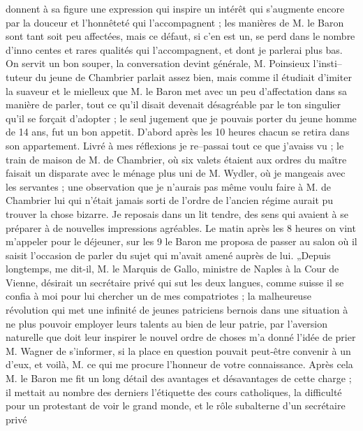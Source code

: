 \documentclass[12pt]{article}
\begin{document}
 donnent à sa figure une expression qui
inspire un intérêt qui s’augmente encore par la douceur et l’honnêteté qui l’accompagnent ; les
manières de M. le Baron sont tant soit peu affectées, mais ce défaut, si c’en est un, se perd dans
le nombre d’inno centes et rares qualités qui l’accompagnent, et dont je parlerai plus bas. On
servit un bon souper, la conversation devint générale, M. Poinsieux l’insti–tuteur du jeune de
Chambrier parlait assez bien, mais comme il étudiait d’imiter la suaveur et le mielleux que M. le
Baron met avec un peu d’affectation dans sa manière de parler, tout ce qu’il disait devenait
désagréable par le ton singulier qu’il se forçait d’adopter ; le seul jugement que je pouvais porter
du jeune homme de 14 ans, fut un bon appetit. D’abord après les 10 heures chacun se retira dans son
appartement. Livré à mes réflexions je re–passai tout ce que j’avaiss vu ; le train de maison de M.
de Chambrier, où six valets étaient aux ordres du maître faisait un disparate avec le ménage plus
uni de M. Wydler, où je mangeais avec les servantes ; une observation que je n’aurais pas même voulu
faire à M. de Chambrier lui qui n’était jamais sorti de l’ordre de l’ancien régime aurait pu trouver
la chose bizarre. Je reposais dans un lit tendre, des sens qui avaient à se préparer à de nouvelles
impressions agréables. Le matin après les 8 heures on vint m’appeler pour le déjeuner, sur les 9 le
Baron me proposa de passer au salon où il saisit l’occasion de parler du sujet qui m’avait amené
auprès de lui. „Depuis longtemps, me dit-il, M. le Marquis de Gallo, ministre de Naples à la Cour de
Vienne, désirait un secrétaire privé qui sut les deux langues, comme suisse il se confia à moi pour
lui chercher un de mes compatriotes ; la malheureuse révolution qui met une infinité de jeunes
patriciens bernois dans une situation à ne plus pouvoir employer leurs talents au bien de leur
patrie, par l’aversion naturelle que doit leur inspirer le nouvel ordre de choses m’a donné l’idée
de prier M. Wagner de s’informer, si la place en question pouvait peut-être convenir à un d’eux, et
voilà, M. ce qui me procure l’honneur de votre connaissance. Après cela M. le Baron me fit un long
détail des avantages et désavantages de cette charge ; il mettait au nombre des derniers l’étiquette
des cours catholiques, la difficulté pour un protestant de voir le grand monde, et le rôle
subalterne d’un secrétaire privé
\end{document}
